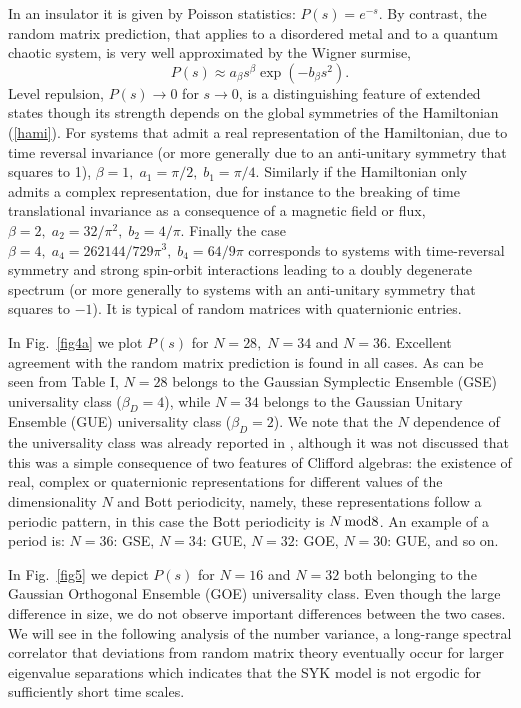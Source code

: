 \documentclass[aps,showpacs,floatfix,superscriptaddress,pre,11pt]{revtex4-1}
\begin{document}
In an insulator it is given by Poisson statistics:
$
P(s) = e^{-s}.$
By contrast, the random matrix prediction, that applies to a disordered metal and to a quantum chaotic system, is very well approximated by the Wigner surmise, 
\begin{equation}
P(s) \approx a_\beta s^\beta\exp(-b_\beta s^2).
\label{eq:wd}
\end{equation}
Level repulsion, $P(s) \to 0$ for $s \to 0$, is a distinguishing feature of extended states though its strength depends on the global symmetries of the Hamiltonian (\ref{hami}). For systems that admit a real representation of the Hamiltonian,
due to time reversal invariance (or more generally due to an anti-unitary symmetry that
squares to 1), $\beta =1,\; a_1 = {\pi}/{2},\; b_1= {\pi}/{4}$. Similarly if the Hamiltonian only admits a complex representation, due for instance to the breaking of time translational invariance as a consequence of a magnetic field or flux,
$\beta =2,\; a_2 = {32}/{\pi^2},\; b_2= {4}/{\pi}$.
Finally the case  $\beta = 4,\; a_4 = {262144}/{729\pi^3},\; b_4= {64}/{9\pi}$
corresponds to systems with time-reversal symmetry and strong spin-orbit interactions leading to a doubly degenerate spectrum 
(or more generally to systems with an anti-unitary symmetry that squares to $-1$).
It is typical of random matrices with quaternionic entries. 


In Fig.~\ref{fig4a} we plot $P(s)$ for $N = 28,\;N = 34$ and  $N = 36$.
Excellent agreement with the random matrix prediction is found in all cases. As can be seen from Table I,
$N=28$ belongs to the Gaussian Symplectic Ensemble (GSE) universality class ($\beta_D = 4$), while
$N = 34$ belongs to the Gaussian Unitary Ensemble (GUE) universality class ($\beta_D = 2$).
We note that the $N$ dependence of the universality class was already reported in \cite{you2016}, although it was not  discussed that this was a simple consequence of two features of Clifford algebras: the existence of real, complex or quaternionic representations for different values of the dimensionality $N$ and Bott periodicity, namely, these representations follow a periodic pattern, in this case the Bott periodicity is $N\, {\rm mod} 8$. An example of a period is: $N = 36$: GSE, $N = 34$: GUE, $N = 32$: GOE, $N = 30$: GUE, and so on.
 
 
In Fig.~\ref{fig5} we depict $P(s)$ for $N = 16$ and $N= 32$ both belonging to the Gaussian Orthogonal Ensemble (GOE) universality class. 
Even though the large difference in size, we do not observe important differences between the two cases. 
We will see in the following analysis of the number variance, a long-range spectral correlator that deviations from random matrix theory eventually occur for larger eigenvalue separations which indicates that the SYK model is not ergodic for sufficiently short time scales.
\end{document}
